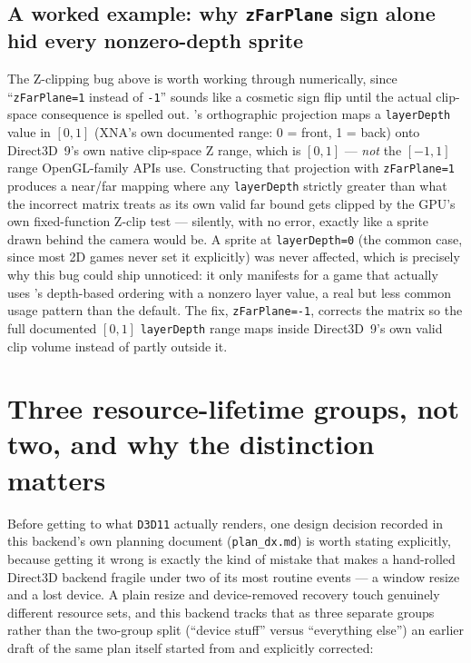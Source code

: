 \subsection{A worked example: why \texttt{zFarPlane} sign alone hid every nonzero-depth sprite}

The Z-clipping bug above is worth working through numerically, since ``\texttt{zFarPlane=1}
instead of \texttt{-1}'' sounds like a cosmetic sign flip until the actual clip-space
consequence is spelled out. 's orthographic projection maps a
\texttt{layerDepth} value in $[0, 1]$ (XNA's own documented range: 0 = front, 1 = back) onto
Direct3D~9's own native clip-space Z range, which is $[0, 1]$ --- \emph{not} the
$[-1, 1]$ range OpenGL-family APIs use. Constructing that projection with
\texttt{zFarPlane=1} produces a near/far mapping where any \texttt{layerDepth} strictly
greater than what the incorrect matrix treats as its own valid far bound gets clipped by the
GPU's own fixed-function Z-clip test --- silently, with no error, exactly like a sprite drawn
behind the camera would be. A sprite at \texttt{layerDepth=0} (the common case, since most
2D games never set it explicitly) was never affected, which is precisely why this bug could
ship unnoticed: it only manifests for a game that actually uses 's
depth-based ordering with a nonzero layer value, a real but less common 
usage pattern than the default. The fix, \texttt{zFarPlane=-1}, corrects the matrix so the
full documented $[0,1]$ \texttt{layerDepth} range maps inside Direct3D~9's own valid clip
volume instead of partly outside it.

\section{Three resource-lifetime groups, not two, and why the distinction matters}
\label{sec:d3d11-lifetime-groups}

Before getting to what \texttt{D3D11} actually renders, one design decision recorded in this
backend's own planning document (\texttt{plan\_dx.md}) is worth stating explicitly, because
getting it wrong is exactly the kind of mistake that makes a hand-rolled Direct3D backend
fragile under two of its most routine events --- a window resize and a lost device. A plain
resize and device-removed recovery touch genuinely different resource sets, and this backend
tracks that as three separate groups rather than the two-group split (``device stuff'' versus
``everything else'') an earlier draft of the same plan itself started from and explicitly
corrected:

